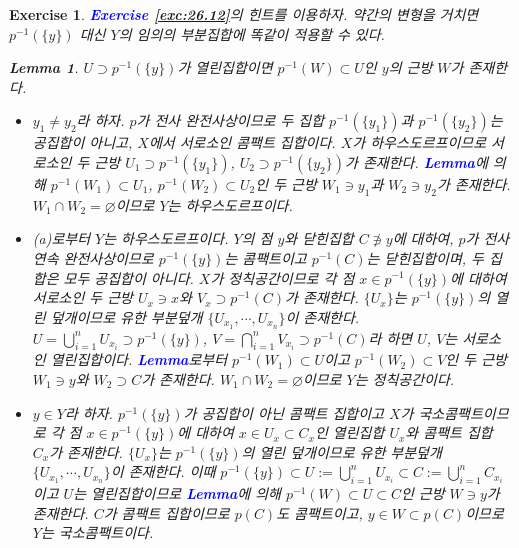 \documentclass{article}
\newtheorem{exercise}{Exercise}[section]
\newtheorem*{lem}{Lemma}
\begin{document}
\begin{exercise}
    \textcolor{blue}{\textbf{Exercise \ref{exc:26.12}}}의 힌트를 이용하자. 약간의 변형을 거치면 $p^{-1}(\{y\})$ 대신 $Y$의 임의의 부분집합에 똑같이 적용할 수 있다.
    \begin{lem}
        $U\supset p^{-1}(\{y\})$가 열린집합이면 $p^{-1}(W)\subset U$인 $y$의 근방 $W$가 존재한다.
    \end{lem}
    \begin{itemize}
        \item[(a)] $y_1\ne y_2$라 하자. $p$가 전사 완전사상이므로 두 집합 $p^{-1}(\{y_1\})$과 $p^{-1}(\{y_2\})$는 공집합이 아니고, $X$에서 서로소인 콤팩트 집합이다. $X$가 하우스도르프이므로 서로소인 두 근방 $U_1\supset p^{-1}(\{y_1\})$, $U_2\supset p^{-1}(\{y_2\})$가 존재한다. \textcolor{blue}{\textbf{Lemma}}에 의해 $p^{-1}(W_1)\subset U_1$, $p^{-1}(W_2)\subset U_2$인 두 근방 $W_1\ni y_1$과 $W_2\ni y_2$가 존재한다. $W_1\cap W_2=\varnothing$이므로 $Y$는 하우스도르프이다.
        \item[(b)] (a)로부터 $Y$는 하우스도르프이다. $Y$의 점 $y$와 닫힌집합 $C\not\ni y$에 대하여, $p$가 전사 연속 완전사상이므로 $p^{-1}(\{y\})$는 콤팩트이고 $p^{-1}(C)$는 닫힌집합이며, 두 집합은 모두 공집합이 아니다. $X$가 정칙공간이므로 각 점 $x\in p^{-1}(\{y\})$에 대하여 서로소인 두 근방 $U_x\ni x$와 $V_x\supset p^{-1}(C)$가 존재한다. $\{U_x\}$는 $p^{-1}(\{y\})$의 열린 덮개이므로 유한 부분덮개 $\{U_{x_1},\cdots,U_{x_n}\}$이 존재한다. $U=\bigcup_{i=1}^nU_{x_i}\supset p^{-1}(\{y\})$, $V=\bigcap_{i=1}^nV_{x_i}\supset p^{-1}(C)$라 하면 $U$, $V$는 서로소인 열린집합이다. \textcolor{blue}{\textbf{Lemma}}로부터 $p^{-1}(W_1)\subset U$이고 $p^{-1}(W_2)\subset V$인 두 근방 $W_1\ni y$와 $W_2\supset C$가 존재한다. $W_1\cap W_2=\varnothing$이므로 $Y$는 정칙공간이다.
        \item[(c)] $y\in Y$라 하자. $p^{-1}(\{y\})$가 공집합이 아닌 콤팩트 집합이고 $X$가 국소콤팩트이므로 각 점 $x\in p^{-1}(\{y\})$에 대하여 $x\in U_x\subset C_x$인 열린집합 $U_x$와 콤팩트 집합 $C_x$가 존재한다. $\{U_x\}$는 $p^{-1}(\{y\})$의 열린 덮개이므로 유한 부분덮개 $\{U_{x_1},\cdots,U_{x_n}\}$이 존재한다. 이때 $p^{-1}(\{y\})\subset U:=\bigcup_{i=1}^nU_{x_i}\subset C:=\bigcup_{i=1}^nC_{x_i}$이고 $U$는 열린집합이므로 \textcolor{blue}{\textbf{Lemma}}에 의해 $p^{-1}(W)\subset U\subset C$인 근방 $W\ni y$가 존재한다. $C$가 콤팩트 집합이므로 $p(C)$도 콤팩트이고, $y\in W\subset p(C)$이므로 $Y$는 국소콤팩트이다.

\end{itemize}
\end{exercise}
\end{document}
